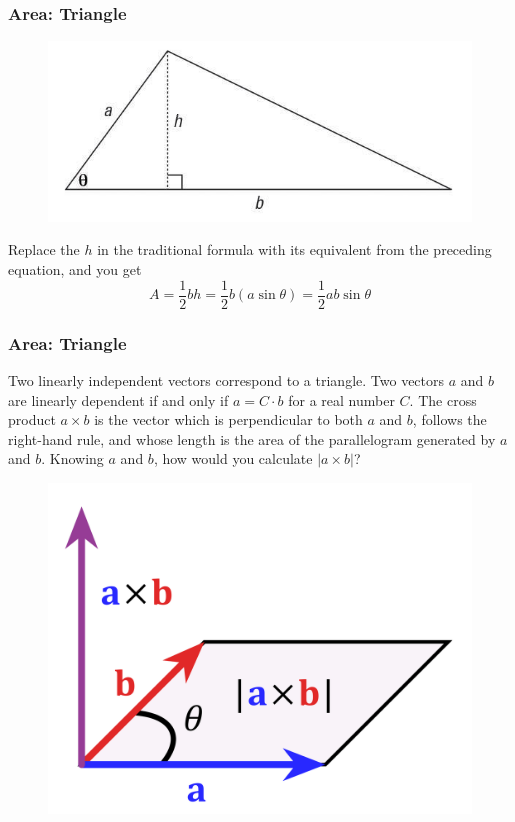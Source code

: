 \documentclass[xcolor=dvipsnames]{beamer}
\begin{document}
\begin{frame}
  \frametitle{Area: Triangle}
  \begin{figure}[h]
    \includegraphics[scale=.5]{./areatri.png}
  \end{figure}
  Replace the $h$ in the traditional formula with its equivalent from
  the preceding equation, and you get
  \begin{equation}
    \label{eq:eakohcel}
    A=\frac{1}{2}bh=\frac{1}{2}b(a\sin\theta)=\frac{1}{2}ab\sin\theta
  \end{equation}
\end{frame}

\begin{frame}
  \frametitle{Area: Triangle}
  Two linearly independent vectors correspond to a triangle. Two
  vectors $a$ and $b$ are \alert{linearly dependent} if and only if
  $a=C\cdot{}b$ for a real number $C$. The cross product $a\times{}b$
  is the vector which is perpendicular to both $a$ and $b$, follows
  the right-hand rule, and whose length is the area of the
  parallelogram generated by $a$ and $b$. Knowing $a$ and $b$, how
  would you calculate $|a\times{}b|$?
  \begin{figure}[h]
    \includegraphics[scale=.08]{./Gyvro.png}
  \end{figure}
\end{frame}
\end{document}
